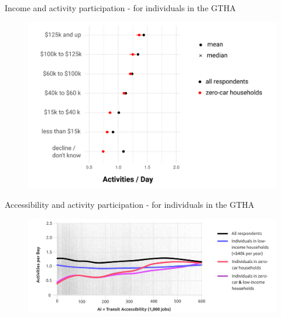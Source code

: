 \documentclass[aspectratio=169]{beamer}
\begin{document}
\begin{frame}
	
	Income and activity participation - for individuals in the GTHA
	
	\begin{figure}
		\centering
		\includegraphics[width=0.94\linewidth]{images/income_activities_gtha.png}
	\end{figure}
	
\end{frame}




\begin{frame}
	
	Accessibility and activity participation - for individuals in the GTHA
	
	\begin{figure}
		\centering
		\includegraphics[width=0.94\linewidth]{images/accessibility_activities_gtha.png}
	\end{figure}
	
\end{frame}
\end{document}
